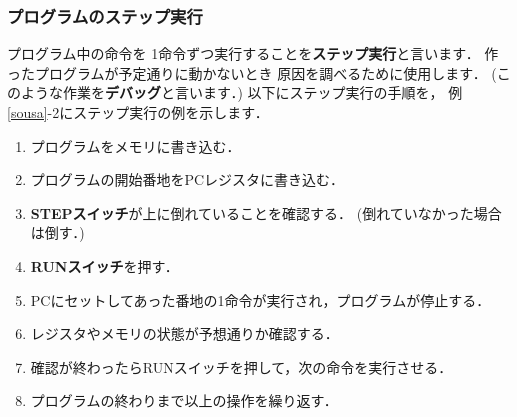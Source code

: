 \subsubsection{プログラムのステップ実行}
\label{step}
プログラム中の命令を
1命令ずつ実行することを{\bf ステップ実行}と言います．
作ったプログラムが予定通りに動かないとき
原因を調べるために使用します．
(このような作業を{\bf デバッグ}と言います．)
以下にステップ実行の手順を，
例\ref{sousa}-2にステップ実行の例を示します．

\begin{enumerate}
\item プログラムをメモリに書き込む．
\item プログラムの開始番地をPCレジスタに書き込む．
\item {\bf STEPスイッチ}が上に倒れていることを確認する．
(倒れていなかった場合は倒す．)
\item {\bf RUNスイッチ}を押す．
\item PCにセットしてあった番地の1命令が実行され，プログラムが停止する．
\item レジスタやメモリの状態が予想通りか確認する．
\item 確認が終わったらRUNスイッチを押して，次の命令を実行させる．
\item プログラムの終わりまで以上の操作を繰り返す．
\end{enumerate}

\begin{figure}[tb]
\end{figure}

